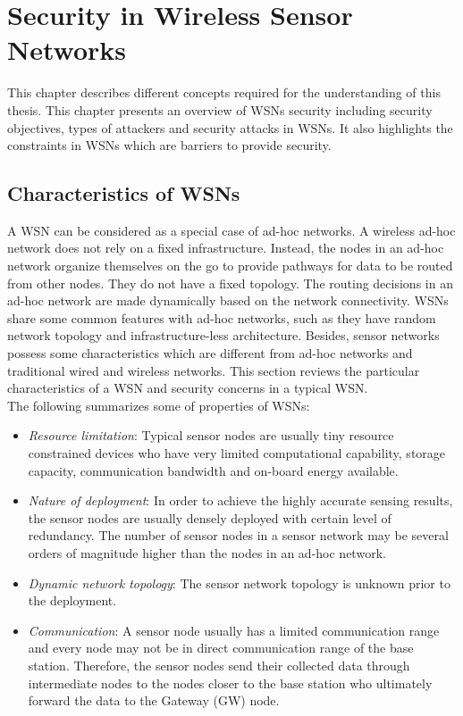 \documentclass[a4paper,12pt]{report}
\begin{document}
\afterpage{\null\newpage}

\chapter{Security in Wireless Sensor Networks}
\label{Ch2} This chapter describes different concepts required for
the understanding of this thesis. This chapter presents an overview
of WSNs security including security objectives, types of attackers
and security attacks in WSNs. It also highlights the constraints in
WSNs which are barriers to provide security.


\section{Characteristics of WSNs}
A WSN can be considered as a special case of ad-hoc networks. A
wireless ad-hoc network does not rely on a fixed infrastructure.
Instead, the nodes in an ad-hoc network organize themselves on the
go to provide pathways for data to be routed from other nodes. They
do not have a fixed topology. The routing decisions in an ad-hoc
network are made dynamically based on the network connectivity. WSNs
share some common features with ad-hoc networks, such as they have
random network topology and infrastructure-less architecture.
Besides, sensor networks possess some characteristics which are
different from ad-hoc networks and traditional wired and wireless
networks. This section reviews the particular characteristics of
a WSN and security concerns in a typical WSN. \\
\linebreak
The following summarizes some of properties of WSNs:

\begin{itemize}
\item \textit{Resource limitation}: Typical sensor nodes are
usually tiny resource constrained devices who have very limited
computational capability, storage capacity, communication bandwidth
and on-board energy available.

\item \textit{Nature of deployment}: In order to achieve the highly
accurate sensing results, the sensor nodes are usually densely
deployed with certain level of redundancy. The number of sensor
nodes in a sensor network may be several orders of magnitude higher
than the nodes in an ad-hoc network.

\item \textit{Dynamic network topology}: The sensor network topology
is unknown prior to the deployment.

\item \textit{Communication}: A sensor node usually has a limited
communication range and every node may not be in direct
communication range of the base station. Therefore, the sensor nodes
send their collected data through intermediate nodes to the nodes
closer to the base station who ultimately forward the data to the
Gateway (GW) node.
\end{itemize}
\end{document}
